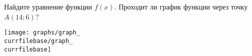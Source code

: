 \begin{ex}
	\begin{condition}
		\begin{minipage}[t]{0.67\textwidth}
			Найдите уравнение функции $f(x)$. Проходит ли график функции через точку \( A(14;6) \)?
		\end{minipage}
		\begin{minipage}[c]{0.25\textwidth}
			\texttt{[image: graphs/graph\_\\currfilebase/graph\_\\currfilebase]}
		\end{minipage}
	\end{condition}
\end{ex}